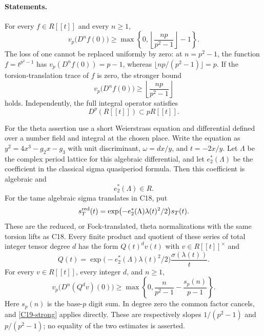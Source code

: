 \paragraph{Statements.}
For every $f\in R[[t]]$ and every $n\geq1$,
\begin{equation}\label{C19-strong}
 v_p\bigl(D^nf(0)\bigr)
 \geq\max\left\{0,
       \left\lfloor\frac{np}{p^2-1}\right\rfloor-1\right\}.
\end{equation}
The loss of one cannot be replaced uniformly by zero: at
$n=p^2-1$, the function $f=t^{p^2-1}$ has
$v_p(D^nf(0))=p-1$, whereas
$\lfloor np/(p^2-1)\rfloor=p$.
If the torsion-translation trace of $f$ is zero, the stronger bound
\begin{equation}\label{C19-trace-zero}
 v_p\bigl(D^nf(0)\bigr)
       \geq\left\lfloor\frac{np}{p^2-1}\right\rfloor
\end{equation}
holds.  Independently, the full integral operator satisfies
\begin{equation}\label{C19-Dp}
 D^p(R[[t]])\subset pR[[t]].
\end{equation}

For the theta assertion use a short Weierstrass equation and
differential defined over a number field and integral at the
chosen place.  Write the equation as
$y^2=4x^3-g_2x-g_3$ with unit discriminant,
$\omega=dx/y$, and $t=-2x/y$.  Let $\Lambda$ be the complex period
lattice for this algebraic differential, and let $e_2^*(\Lambda)$
be the coefficient in the classical sigma quasiperiod formula.
Then this coefficient is algebraic and
\begin{equation}\label{C19-e2-integral}
 e_2^*(\Lambda)\in R.
\end{equation}
For the tame algebraic sigma translates in C18, put
\[
 s_T^{\rm red}(t)=
 \exp\bigl(-e_2^*(\Lambda)\lambda(t)^2/2\bigr)s_T(t).
\]
These are the reduced, or Fock-translated, theta normalizations
with the same torsion lifts as C18.  Every finite product and
quotient of these series of total integer tensor degree $d$ has
the form $Q(t)^d v(t)$ with $v\in R[[t]]^\times$ and
\[
 Q(t)=\exp\bigl(-e_2^*(\Lambda)\lambda(t)^2/2\bigr)
            \frac{\sigma(\lambda(t))}{t}.
\]
For every $v\in R[[t]]$, every integer $d$, and $n\geq1$,
\begin{equation}\label{C19-theta-weak}
 v_p\bigl(D^n(Q^dv)(0)\bigr)
 \geq\max\left\{0,
       \frac{n}{p^2-1}-\frac{s_p(n)}{p-1}\right\}.
\end{equation}
Here $s_p(n)$ is the base-$p$ digit sum.  In degree zero the common
factor cancels, and \eqref{C19-strong} applies directly.
These are respectively slopes $1/(p^2-1)$ and $p/(p^2-1)$;
no equality of the two estimates is asserted.


